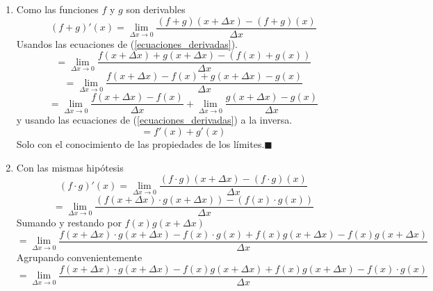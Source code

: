 \documentclass[10pt,twoside]{SelfArx} %
\begin{document}
\begin{enumerate}
	\item 	Como las funciones $ f $ y $ g $ son derivables
	\begin{equation}
	(f+g)'(x)=\lim\limits_{\Delta x\rightarrow 0}\dfrac{(f+g)(x+\Delta x)-(f+g)(x)}{\Delta x}
	\end{equation}
	Usandos las ecuaciones de (\ref{ecuaciones_derivadas}).
	\begin{equation}
	=\lim\limits_{\Delta x\rightarrow 0}\dfrac{f(x+\Delta x)+g(x+\Delta x)-(f(x)+g(x))}{\Delta x}
	\end{equation}
	\begin{equation}
	=\lim\limits_{\Delta x\rightarrow 0}\dfrac{f(x+\Delta x)-f(x)+g(x+\Delta x)-g(x)}{\Delta x}
	\end{equation}
	\begin{equation}
	=\lim\limits_{\Delta x\rightarrow 0}\dfrac{f(x+\Delta x)-f(x)}{\Delta x}
	+\lim\limits_{\Delta x\rightarrow 0}\dfrac{g(x+\Delta x)-g(x)}{\Delta x}
	\end{equation}
	y usando las ecuaciones de (\ref{ecuaciones_derivadas}) a la inversa.
	\begin{equation}
	=f'(x)+g'(x)
	\end{equation}
	Solo con el conocimiento de las propiedades de los l\'imites.$ \blacksquare $
	\item Con las mismas hip\'otesis
	\begin{equation}
	(f\cdot g)'(x)=\lim\limits_{\Delta x\rightarrow 0}\dfrac{(f\cdot g)(x+\Delta x)-(f\cdot g)(x)}{\Delta x}
	\end{equation}
	\begin{equation}
	=\lim\limits_{\Delta x\rightarrow 0}\dfrac{(f(x+\Delta x)\cdot g(x+\Delta x))-(f(x)\cdot g(x))}{\Delta x}
	\end{equation}
Sumando y restando por $ f(x)g(x+\Delta x) $
\begin{equation}
	=\lim\limits_{\Delta x\rightarrow 0}\dfrac{f(x+\Delta x)\cdot g(x+\Delta x)-f(x)\cdot g(x)+f(x)g(x+\Delta x)-f(x)g(x+\Delta x)}{\Delta x}
\end{equation}
Agrupando convenientemente
\begin{equation}
	=\lim\limits_{\Delta x\rightarrow 0}\dfrac{f(x+\Delta x)\cdot g(x+\Delta x)-f(x)g(x+\Delta x)+f(x)g(x+\Delta x)-f(x)\cdot g(x)}{\Delta x}
\end{equation}

\end{enumerate}
\end{document}
